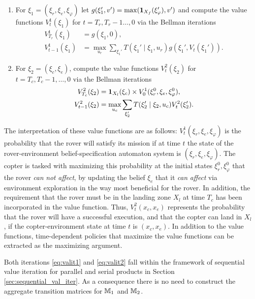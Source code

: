 \documentclass[conference]{IEEEtran}
\begin{document}
\begin{enumerate}
  \item For $\xi_1 = (\xi_r, \xi_e, \xi_\varphi)$ let $g(\xi_1', v') = \max( \mathbf{1}_{X_f}(\xi_\varphi'), v' )$ and compute the value functions $V^1_t(\xi_1)$ for $t = T_r, T_r-1 \ldots, 0$ via the Bellman iterations
  \begin{equation}
  \label{eq:valit1}
  \begin{aligned}
      V^1_{T_r}(\xi_1) & = g(\xi_1, 0), \\
      V^1_{t-1} (\xi_1) & = \max_{u_r} \sum_{\xi_1'} T(\xi_1' \mid \xi_1, u_r) g(\xi_1', V_t(\xi_1')).
  \end{aligned}
  \end{equation} 
  \item For $\xi_2 = (\xi_c, \xi_e)$, compute the value functions $V^2_t(\xi_2)$ for $t = T_c, T_c-1, \ldots, 0$ via the Bellman iterations
  \begin{equation}
  \label{eq:valit2}
  \begin{aligned}
    V_{T_c}^2(\xi_2) & = \ind_{X_l} (\xi_c) \times V^1_0(\xi_r^0, \xi_e, \xi_\varphi^0), \\
    V_{t-1}^2(\xi_2) & = \max_{u_c} \sum_{\xi_2'} T(\xi_2' \mid \xi_2, u_c) V^2_t(\xi_2').
  \end{aligned}
  \end{equation}
\end{enumerate}
The interpretation of these value functions are as follows: $V_t^1(\xi_r, \xi_e, \xi_\varphi)$ is the probability that the rover will satisfy its mission if at time $t$ the state of the rover-environment belief-specification automaton system is $(\xi_r, \xi_e, \xi_\varphi)$. The copter is tasked with maximizing this probability at the initial states $\xi_r^0, \xi_\varphi^0$ that the rover \emph{can not affect}, by updating the belief $\xi_e$ that it \emph{can affect} via environment exploration in the way most beneficial for the rover. In addition, the requirement that the rover must be in the landing zone $X_l$ at time $T_c$ has been incorporated in the value function. Thus, $V_t^2(x_c, x_e)$ represents the probability that the rover will have a successful execution, and that the copter can land in $X_l$, if the copter-environment state at time $t$ is $(x_c, x_e)$. In addition to the value functions, time-dependent policies that maximize the value functions can be extracted as the maximizing argument.

Both iterations \eqref{eq:valit1} and \eqref{eq:valit2} fall within the framework of sequential value iteration for parallel and serial products in Section \ref{sec:sequential_val_iter}. As a consequence there is no need to construct the aggregate transition matrices for $\mathbb{M}_1$ and $\mathbb{M}_2$.
\end{document}
